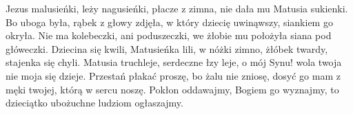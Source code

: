 \beginverse
Jezus malusieńki, leży nagusieńki,
płacze z zimna, nie dała mu Matusia sukienki.
\endverse
\beginverse
Bo uboga była, rąbek z głowy zdjęła,
w który dziecię uwinąwszy, siankiem go okryła.
\endverse
\beginverse
Nie ma kolebeczki, ani poduszeczki,
we żłobie mu położyła siana pod główeczki.
\endverse
\beginverse
Dziecina się kwili, Matusieńka lili,
w nóżki zimno, żłóbek twardy, stajenka się chyli.
\endverse
\beginverse
Matusia truchleje, serdeczne łzy leje,
o mój Synu! wola twoja nie moja się dzieje.
\endverse
\beginverse
Przestań płakać proszę, bo żalu nie zniosę,
dosyć go mam z męki twojej, którą w sercu noszę.
\endverse
\beginverse
Pokłon oddawajmy, Bogiem go wyznajmy,
to dzieciątko ubożuchne ludziom ogłaszajmy.
\endverse
\endsong
